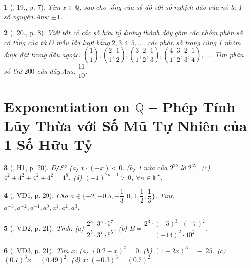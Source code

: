 \documentclass{article}
\newtheorem{baitoan}{}
\begin{document}
\begin{baitoan}[\cite{Binh_Toan_7_tap_1}, 19., p. 7]
	Tìm $x\in\mathbb{Q}$, sao cho tổng của số đó với số nghịch đảo của nó là 1 số nguyên.\hfill{\sf Ans: $\pm 1$.}
\end{baitoan}

\begin{baitoan}[\cite{Binh_Toan_7_tap_1}, 20., p. 8]
	Viết tất cả các số hữu tỷ dương  thành dãy gồm các nhóm phân số có tổng của tử \& mẫu lần lượt bằng $2,3,4,5,\ldots$, các phân số trong cùng 1 nhóm được đặt trong dấu ngoặc: $\left(\dfrac{1}{1}\right),\left(\dfrac{2}{1},\dfrac{1}{2}\right),\left(\dfrac{3}{1},\dfrac{2}{2},\dfrac{1}{3}\right),\left(\dfrac{4}{1},\dfrac{3}{2},\dfrac{2}{3},\dfrac{1}{4}\right),\ldots$. Tìm phân số thứ $200$ của dãy.\hfill{\sf Ans: $\dfrac{11}{10}$.}
\end{baitoan}


\section{Exponentiation on $\mathbb{Q}$ -- Phép Tính Lũy Thừa với Số Mũ Tự Nhiên của 1 Số Hữu Tỷ}

\begin{baitoan}[\cite{Binh_boi_duong_Toan_7_tap_1}, H1, p. 20]
	{\rm Đ{\tt/}S?} (a) $x\cdot(-x) < 0$. (b) 1 nửa của $2^{98}$ là $2^{49}$. (c) $4^2 + 4^2 + 4^2 + 4^2 = 4^8$. (d) $(-1)^{2n - 1} > 0$, $\forall n\in\mathbb{N}^\star$.
\end{baitoan}

\begin{baitoan}[\cite{Binh_boi_duong_Toan_7_tap_1}, VD1, p. 20]
	Cho $a\in\{-2,-0.5,-\dfrac{1}{3},0,1,\dfrac{1}{2},\dfrac{1}{3}\}$. Tính $a^{-3},a^{-2},a^{-1},a^0,a^1,a^2,a^3$.
\end{baitoan}

\begin{baitoan}[\cite{Binh_boi_duong_Toan_7_tap_1}, VD2, p. 21]
	Tính: (a) $\dfrac{2^3\cdot3^5\cdot5^7}{2^5\cdot3^7\cdot5^5}$. (b) $B = \dfrac{2^3\cdot(-5)^3\cdot(-7)^2}{(-14)^2\cdot10^2}$.
\end{baitoan}

\begin{baitoan}[\cite{Binh_boi_duong_Toan_7_tap_1}, VD3, p. 21]
	Tìm $x$: (a) $(0.2 - x)^2 = 0$. (b) $(1 - 2x)^3 = -125$. (c) $(0.7)^3x = (0.49)^2$. (d) $x:(-0.3)^3 = (0.3)^2$.
\end{baitoan}
\end{document}
